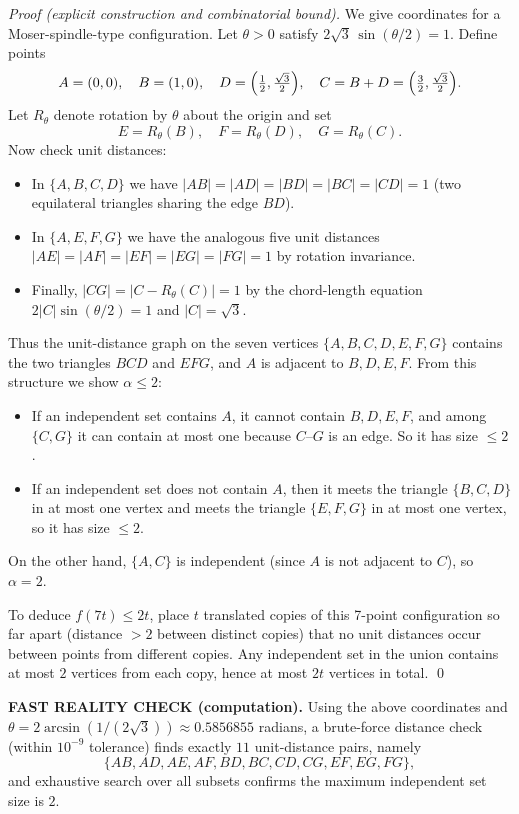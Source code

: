 \emph{Proof (explicit construction and combinatorial bound).}
We give coordinates for a Moser-spindle-type configuration.
Let $\theta>0$ satisfy $2\sqrt{3}\,\sin(\theta/2)=1$.
Define points
\[
A=(0,0),\quad B=(1,0),\quad D=\Bigl(\tfrac12,\tfrac{\sqrt{3}}{2}\Bigr),\quad C=B+D=\Bigl(\tfrac32,\tfrac{\sqrt{3}}{2}\Bigr).
\]
Let $R_\theta$ denote rotation by $\theta$ about the origin and set
\[
E=R_\theta(B),\quad F=R_\theta(D),\quad G=R_\theta(C).
\]
Now check unit distances:
\begin{itemize}
\item In $\{A,B,C,D\}$ we have $|AB|=|AD|=|BD|=|BC|=|CD|=1$ (two equilateral triangles sharing the edge $BD$).
\item In $\{A,E,F,G\}$ we have the analogous five unit distances $|AE|=|AF|=|EF|=|EG|=|FG|=1$ by rotation invariance.
\item Finally, $|CG|=|C-R_\theta(C)|=1$ by the chord-length equation $2|C|\sin(\theta/2)=1$ and $|C|=\sqrt{3}$.
\end{itemize}
Thus the unit-distance graph on the seven vertices $\{A,B,C,D,E,F,G\}$ contains the two triangles $B\!C\!D$ and $E\!F\!G$, and $A$ is adjacent to $B,D,E,F$.
From this structure we show $\alpha\le 2$:
\begin{itemize}
\item If an independent set contains $A$, it cannot contain $B,D,E,F$, and among $\{C,G\}$ it can contain at most one because $C$--$G$ is an edge. So it has size $\le 2$.
\item If an independent set does not contain $A$, then it meets the triangle $\{B,C,D\}$ in at most one vertex and meets the triangle $\{E,F,G\}$ in at most one vertex, so it has size $\le 2$.
\end{itemize}
On the other hand, $\{A,C\}$ is independent (since $A$ is not adjacent to $C$), so $\alpha=2$.

To deduce $f(7t)\le 2t$, place $t$ translated copies of this 7-point configuration so far apart (distance $>2$ between distinct copies) that no unit distances occur between points from different copies.  Any independent set in the union contains at most $2$ vertices from each copy, hence at most $2t$ vertices in total. \qed

\textbf{FAST REALITY CHECK (computation).}
Using the above coordinates and $\theta=2\arcsin(1/(2\sqrt{3}))\approx 0.5856855$ radians, a brute-force distance check (within $10^{-9}$ tolerance) finds exactly $11$ unit-distance pairs, namely
\[
\{AB,AD,AE,AF,BD,BC,CD,CG,EF,EG,FG\},
\]
and exhaustive search over all subsets confirms the maximum independent set size is $2$.

